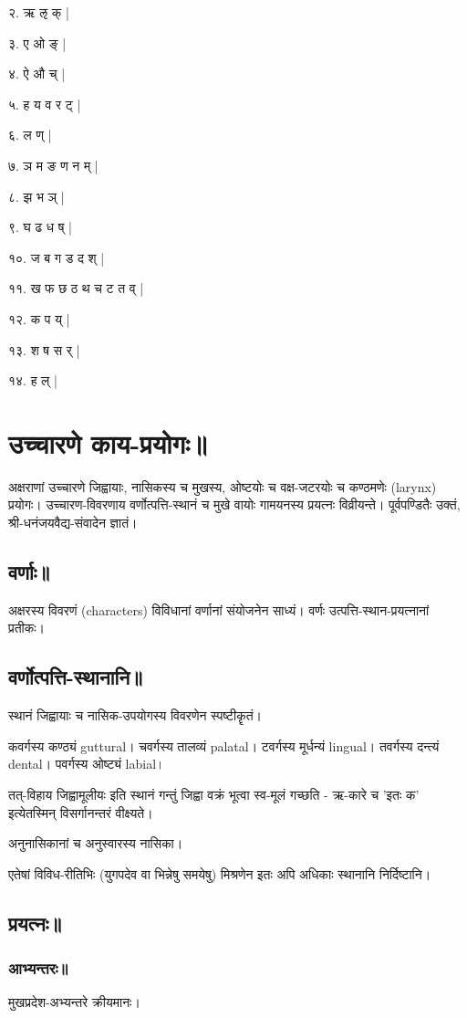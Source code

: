 \documentclass[oneside, article]{memoir}
\begin{document}
२. ऋ ऌ क् |

३. ए ओ ङ् |

४. ऐ औ च् |

५. ह य व र ट् |

६. ल ण् |

७. ञ म ङ ण न म् |

८. झ भ ञ् |

९. घ ढ ध ष् |

१०. ज ब ग ड द श् |

११. ख फ छ ठ थ च ट त व् |

१२. क प य् |

१३. श ष स र् |

१४. ह ल् |

\section{उच्चारणे काय-प्रयोगः॥}
अक्षराणां उच्चारणे जिह्वायाः, नासिकस्य च मुखस्य, ओष्टयोः च वक्ष-जटरयोः च कण्ठमणेः (larynx) प्रयोगः। उच्चारण-विवरणाय वर्णोत्पत्ति-स्थानं च मुखे वायोः गामयनस्य प्रयत्नः विव्रीयन्ते। पूर्वपण्डितैः उक्तं, श्री-धनंजयवैद्य-संवादेन ज्ञातं।

\subsection{वर्णाः॥}
अक्षरस्य विवरणं (characters) विविधानां वर्णानां संयोजनेन साध्यं। वर्णः उत्पत्ति-स्थान-प्रयत्नानां प्रतीकः।

\subsection{वर्णोत्पत्ति-स्थानानि॥}
स्थानं जिह्वायाः च नासिक-उपयोगस्य विवरणेन स्पष्टीकॄतं।

कवर्गस्य कण्ठ्यं guttural। चवर्गस्य तालव्यं palatal। टवर्गस्य मूर्धन्यं lingual। तवर्गस्य दन्त्यं dental। पवर्गस्य ओष्ट्यं labial।

तत्-विहाय जिह्वामूलीयः इति स्थानं गन्तुं जिह्वा वक्रं भूत्वा स्व-मूलं गच्छति - ऋ-कारे च 'इतः क' इत्येतस्मिन् विसर्गानन्तरं वीक्ष्यते।

अनुनासिकानां च अनुस्वारस्य नासिका।

एतेषां विविध-रीतिभिः (युगपदेव वा भिन्नेषु समयेषु) मिश्रणेन इतः अपि अधिकाः स्थानानि निर्दिष्टानि।

\subsection{प्रयत्नः॥}
\subsubsection{आभ्यन्तरः॥}
मुखप्रदेश-अभ्यन्तरे क्रीयमानः।
\end{document}
